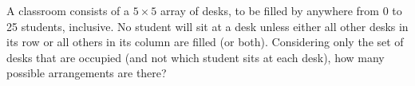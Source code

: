 A classroom consists of a $5\times5$ array of desks, to be filled by anywhere from 0 to 25 students, inclusive. No student will sit at a desk unless either all other desks in its row or all others in its column are filled (or both). Considering only the set of desks that are occupied (and not which student sits at each desk), how many possible arrangements are there?